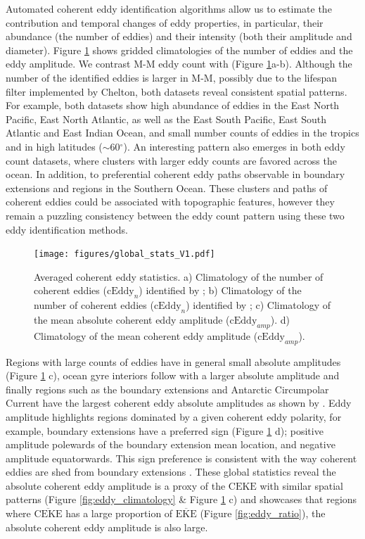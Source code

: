\documentclass[draft,linenumbers]{agujournal2019}
\newcommand{\MEKE}{\overline{\textrm{EKE}}}
\newcommand{\MCEKE}{\overline{\textrm{CEKE}}}
\newcommand{\CEKE}{\textrm{CEKE}}
\newcommand{\cEddy}{\textrm{cEddy}}
\begin{document}
	Automated coherent eddy identification algorithms allow us to estimate the contribution and temporal changes of eddy properties, in particular, their abundance (the number of eddies) and their intensity (both their amplitude and diameter). 
	Figure \ref{fig:eddy_stats_climatology} shows gridded climatologies of the number of eddies and the eddy amplitude. 
	We contrast M-M eddy count with \citet{Chelton_Global_2007} (Figure \ref{fig:eddy_stats_climatology}a-b). Although the number of the identified eddies is larger in M-M, possibly due to the lifespan filter implemented by Chelton, both datasets reveal consistent spatial patterns. 
	For example, both datasets show high abundance of eddies in the East North Pacific, East North Atlantic, as well as the East South Pacific, East South Atlantic and East Indian Ocean, and small number counts of eddies in the tropics and in high latitudes ($\sim$60$^\circ$). 
	An interesting pattern also emerges in both eddy count datasets, where clusters with larger eddy counts are favored across the ocean. In addition, to preferential coherent eddy paths observable in boundary extensions and regions in the Southern Ocean. 
	These clusters and paths of coherent eddies could be associated with topographic features, however they remain a puzzling consistency between the eddy count pattern using these two eddy identification methods.
	
	\begin{figure}
	    \centering
	    \texttt{[image: figures/global\_stats\_V1.pdf]}
	    \caption{Averaged coherent eddy statistics. a) Climatology of the number of coherent eddies ($\cEddy_n$) identified by \citet{Chelton_Global_2007};  b) Climatology of the number of coherent eddies ($\cEddy_n$) identified by \citet{Martinez_TKE_2019}; c) Climatology of the mean absolute coherent eddy amplitude ($\cEddy_{amp}$). d) Climatology of the mean coherent eddy amplitude ($\cEddy_{amp}$).}
	    \label{fig:eddy_stats_climatology}
	\end{figure}
	
	Regions with large counts of eddies have in general small absolute amplitudes (Figure \ref{fig:eddy_stats_climatology} c), ocean gyre interiors follow with a larger absolute amplitude and finally regions such as the boundary extensions and Antarctic Circumpolar Current have the largest coherent eddy absolute amplitudes as shown by \citet{Chelton_The_2011}.
	Eddy amplitude highlights regions dominated by a given coherent eddy polarity, for example, boundary extensions have a preferred sign (Figure \ref{fig:eddy_stats_climatology} d); positive amplitude polewards of the boundary extension mean location, and negative amplitude equatorwards. 
	This sign preference is consistent with the way coherent eddies are shed from boundary extensions \citep{Kang_eddy_characteristics_2013,Chelton_The_2011,Chelton_Global_2007}. 
	These global statistics reveal the absolute coherent eddy amplitude is a proxy of the $\CEKE$ with similar spatial patterns (Figure \ref{fig:eddy_climatology} \& Figure \ref{fig:eddy_stats_climatology} c) and showcases that regions where $\MCEKE$ has a large proportion of $\MEKE$ (Figure \ref{fig:eddy_ratio}), the absolute coherent eddy amplitude is also large.
\end{document}
